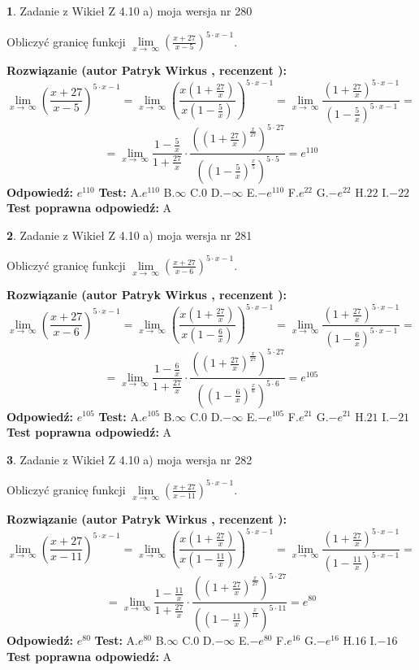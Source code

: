 \documentclass[12pt, a4paper]{article}
\theoremstyle{definition} %
\newtheorem{zad}{}
\newcommand{\zadStart}[1]{\begin{zad}#1\newline}
\newcommand{\zadStop}{\end{zad}}
\newcommand{\rozwStart}[2]{\noindent \textbf{Rozwiązanie (autor #1 , recenzent #2): }\newline}
\newcommand{\rozwStop}{\newline}
\newcommand{\odpStart}{\noindent \textbf{Odpowiedź:}\newline}
\newcommand{\odpStop}{\newline}
\newcommand{\testStart}{\noindent \textbf{Test:}\newline}
\newcommand{\testStop}{\newline}
\newcommand{\kluczStart}{\noindent \textbf{Test poprawna odpowiedź:}\newline}
\newcommand{\kluczStop}{\newline}
\begin{document}
\zadStart{Zadanie z Wikieł Z 4.10 a) moja wersja nr 280}

Obliczyć granicę funkcji  $\lim\limits_{x\to\ \infty}(\frac{x+27}{x-5})^{5\cdot x-1}$.
\zadStop
\rozwStart{Patryk Wirkus}{}
$$\lim\limits_{x\to\ \infty}(\frac{x+27}{x-5})^{5\cdot x-1} = \lim\limits_{x\to\ \infty}(\frac{x(1+\frac{27}{x})}{x(1-\frac{5}{x})})^{5\cdot x-1}=\lim\limits_{x\to\ \infty}\frac{(1+\frac{27}{x})^{5\cdot x-1}}{(1-\frac{5}{x})^{5\cdot x-1}}=$$
$$=\lim\limits_{x\to\ \infty}\frac{1-\frac{5}{x}}{1+\frac{27}{x}}\cdot\frac{((1+\frac{27}{x})^{\frac{x}{27}})^{5\cdot27}}{((1-\frac{5}{x})^{\frac{x}{5}})^{5\cdot5}}=e^{110}$$
\rozwStop
\odpStart
$e^{110}$
\odpStop
\testStart
A.$e^{110}$ B.$\infty$ C.$0$ D.$-\infty$ E.$-e^{110}$
F.$e^{22}$ G.$-e^{22}$
H.$22$
I.$-22$
\testStop
\kluczStart
A
\kluczStop



\zadStart{Zadanie z Wikieł Z 4.10 a) moja wersja nr 281}

Obliczyć granicę funkcji  $\lim\limits_{x\to\ \infty}(\frac{x+27}{x-6})^{5\cdot x-1}$.
\zadStop
\rozwStart{Patryk Wirkus}{}
$$\lim\limits_{x\to\ \infty}(\frac{x+27}{x-6})^{5\cdot x-1} = \lim\limits_{x\to\ \infty}(\frac{x(1+\frac{27}{x})}{x(1-\frac{6}{x})})^{5\cdot x-1}=\lim\limits_{x\to\ \infty}\frac{(1+\frac{27}{x})^{5\cdot x-1}}{(1-\frac{6}{x})^{5\cdot x-1}}=$$
$$=\lim\limits_{x\to\ \infty}\frac{1-\frac{6}{x}}{1+\frac{27}{x}}\cdot\frac{((1+\frac{27}{x})^{\frac{x}{27}})^{5\cdot27}}{((1-\frac{6}{x})^{\frac{x}{6}})^{5\cdot6}}=e^{105}$$
\rozwStop
\odpStart
$e^{105}$
\odpStop
\testStart
A.$e^{105}$ B.$\infty$ C.$0$ D.$-\infty$ E.$-e^{105}$
F.$e^{21}$ G.$-e^{21}$
H.$21$
I.$-21$
\testStop
\kluczStart
A
\kluczStop



\zadStart{Zadanie z Wikieł Z 4.10 a) moja wersja nr 282}

Obliczyć granicę funkcji  $\lim\limits_{x\to\ \infty}(\frac{x+27}{x-11})^{5\cdot x-1}$.
\zadStop
\rozwStart{Patryk Wirkus}{}
$$\lim\limits_{x\to\ \infty}(\frac{x+27}{x-11})^{5\cdot x-1} = \lim\limits_{x\to\ \infty}(\frac{x(1+\frac{27}{x})}{x(1-\frac{11}{x})})^{5\cdot x-1}=\lim\limits_{x\to\ \infty}\frac{(1+\frac{27}{x})^{5\cdot x-1}}{(1-\frac{11}{x})^{5\cdot x-1}}=$$
$$=\lim\limits_{x\to\ \infty}\frac{1-\frac{11}{x}}{1+\frac{27}{x}}\cdot\frac{((1+\frac{27}{x})^{\frac{x}{27}})^{5\cdot27}}{((1-\frac{11}{x})^{\frac{x}{11}})^{5\cdot11}}=e^{80}$$
\rozwStop
\odpStart
$e^{80}$
\odpStop
\testStart
A.$e^{80}$ B.$\infty$ C.$0$ D.$-\infty$ E.$-e^{80}$
F.$e^{16}$ G.$-e^{16}$
H.$16$
I.$-16$
\testStop
\kluczStart
A
\kluczStop
\end{document}
